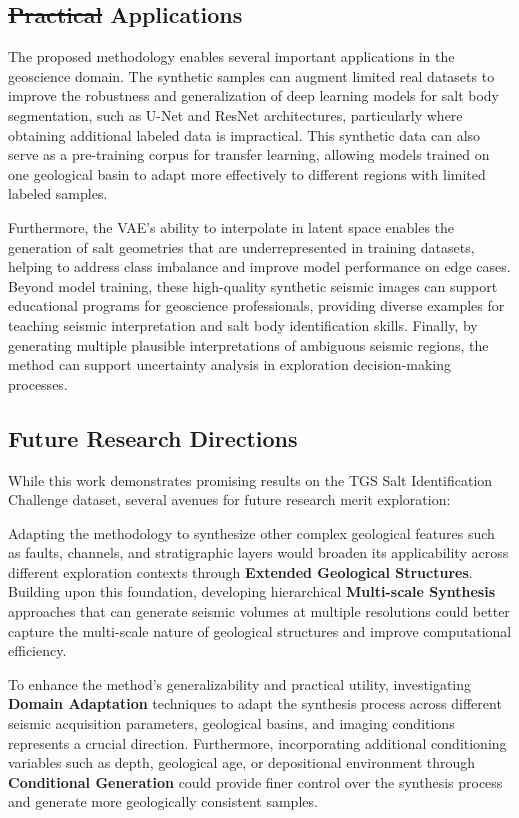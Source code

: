 \documentclass{ieeeaccess}
\makeatletter
\providecommand{\DIFdeltex}[1]{{\protect\color{red}\sout{#1}}} %
\providecommand{\DIFdelbegin}{} %
\providecommand{\DIFdelend}{} %
\providecommand{\DIFdel}[1]{\texorpdfstring{\DIFdeltex{#1}}{}} %
\newcommand{\DIFscaledelfig}{0.5}
\newlength{\DIFdelgraphicswidth} %
\newlength{\DIFdelgraphicsheight} %
\newcommand{\DIFdelincludegraphics}[2][]{%
\sbox{\DIFdelgraphicsbox}{\DIFOincludegraphics[#1]{#2}}%
\settoboxwidth{\DIFdelgraphicswidth}{\DIFdelgraphicsbox} %
\settoboxtotalheight{\DIFdelgraphicsheight}{\DIFdelgraphicsbox} %
\scalebox{\DIFscaledelfig}{%
\parbox[b]{\DIFdelgraphicswidth}{\usebox{\DIFdelgraphicsbox}\\[-\baselineskip] \rule{\DIFdelgraphicswidth}{0em}}\llap{\resizebox{\DIFdelgraphicswidth}{\DIFdelgraphicsheight}{%
\setlength{\unitlength}{\DIFdelgraphicswidth}%
\begin{picture}(1,1)%
\thicklines\linethickness{2pt} %
{\color[rgb]{1,0,0}\put(0,0){\framebox(1,1){}}}%
{\color[rgb]{1,0,0}\put(0,0){\line( 1,1){1}}}%
{\color[rgb]{1,0,0}\put(0,1){\line(1,-1){1}}}%
\end{picture}%
}\hspace*{3pt}}} %
} %
\DeclareRobustCommand{\DIFdelbegin}{\DIFOdelbegin \let\includegraphics\DIFdelincludegraphics} %
\DeclareRobustCommand{\DIFdelend}{\DIFOaddend \let\includegraphics\DIFOincludegraphics} %
\let\sout@orig\sout %
\renewcommand{\sout}[1]{\ifmmode\text{\sout@orig{\ensuremath{#1}}}\else\sout@orig{#1}\fi} %
\makeatother
\begin{document}
\subsection{\DIFdelbegin \DIFdel{Practical }\DIFdelend Applications}

The proposed methodology enables several important applications in the geoscience domain. The synthetic samples can augment limited real datasets to improve the robustness and generalization of deep learning models for salt body segmentation, such as U-Net and ResNet architectures, particularly where obtaining additional labeled data is impractical. This synthetic data can also serve as a pre-training corpus for transfer learning, allowing models trained on one geological basin to adapt more effectively to different regions with limited labeled samples.

Furthermore, the VAE's ability to interpolate in latent space enables the generation of salt geometries that are underrepresented in training datasets, helping to address class imbalance and improve model performance on edge cases. Beyond model training, these high-quality synthetic seismic images can support educational programs for geoscience professionals, providing diverse examples for teaching seismic interpretation and salt body identification skills. Finally, by generating multiple plausible interpretations of ambiguous seismic regions, the method can support uncertainty analysis in exploration decision-making processes.

\subsection{Future Research Directions}

While this work demonstrates promising results on the TGS Salt Identification Challenge dataset, several avenues for future research merit exploration:

Adapting the methodology to synthesize other complex geological features such as faults, channels, and stratigraphic layers would broaden its applicability across different exploration contexts through \textbf{Extended Geological Structures}. Building upon this foundation, developing hierarchical \textbf{Multi-scale Synthesis} approaches that can generate seismic volumes at multiple resolutions could better capture the multi-scale nature of geological structures and improve computational efficiency.

To enhance the method's generalizability and practical utility, investigating \textbf{Domain Adaptation} techniques to adapt the synthesis process across different seismic acquisition parameters, geological basins, and imaging conditions represents a crucial direction. Furthermore, incorporating additional conditioning variables such as depth, geological age, or depositional environment through \textbf{Conditional Generation} could provide finer control over the synthesis process and generate more geologically consistent samples.
\end{document}
